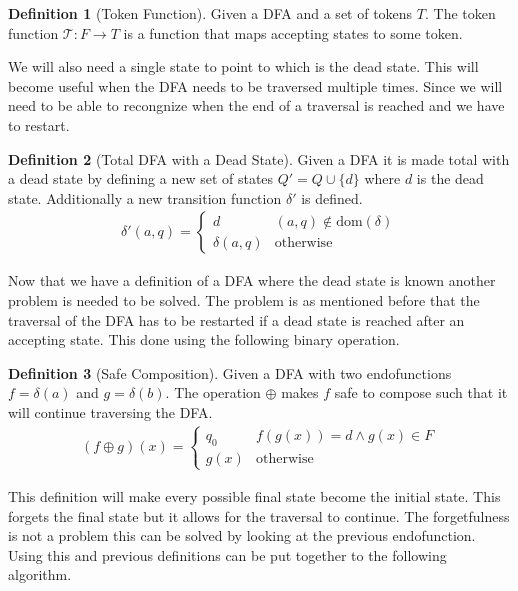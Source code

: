 \documentclass[a4paper,12pt]{article}
\theoremstyle{definition}
\newtheorem{definition}{Definition}[section]
\begin{document}
\begin{definition}[Token Function]
  Given a DFA and a set of tokens $T$. The token function $\mathcal{T}: F \to T$ is a function that maps accepting states to some token.
\end{definition}
\noindent We will also need a single state to point to which is the dead state. This will become useful when the DFA needs to be traversed multiple times. Since we will need to be able to recongnize when the end of a traversal is reached and we have to restart.

\begin{definition}[Total DFA with a Dead State]
  Given a DFA it is made total with a dead state by defining a new set of states $Q' = Q \cup \{d\}$ where $d$ is the dead state. Additionally a new transition function $\delta'$ is defined.
  \begin{align*}
    \delta'(a, q) = \begin{cases}
      d &  (a, q) \notin \text{dom}(\delta) \\
      \delta(a, q) & \text{otherwise}
    \end{cases}
  \end{align*}
\end{definition}
\noindent Now that we have a definition of a DFA where the dead state is known another problem is needed to be solved. The problem is as mentioned before that the traversal of the DFA has to be restarted if a dead state is reached after an accepting state. This done using the following binary operation.

\begin{definition}[Safe Composition]
  Given a DFA with two endofunctions $f = \delta(a)$ and $g = \delta(b)$. The operation $\oplus$ makes $f$ safe to compose such that it will continue traversing the DFA.
  \begin{align*}
    (f \oplus g)(x) =
    \begin{cases}
      q_0 & f(g(x)) = d \land g(x) \in F \\
      g(x) & \text{otherwise} 
    \end{cases}
  \end{align*}
\end{definition}
\noindent This definition will make every possible final state become the initial state. This forgets the final state but it allows for the traversal to continue. The forgetfulness is not a problem this can be solved by looking at the previous endofunction. Using this and previous definitions can be put together to the following algorithm.
\end{document}
